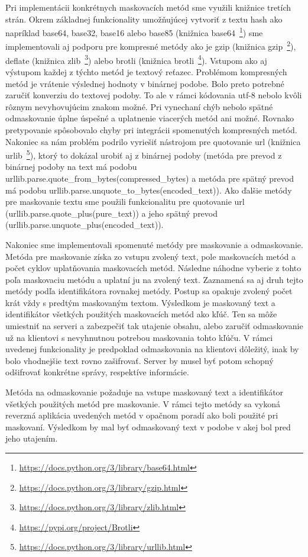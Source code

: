 \documentclass[conference, 11pt,slovak,a4paper,twoside]{IEEEtran}
\begin{document}
Pri implementácii konkrétnych maskovacích metód sme využili knižnice tretích strán. Okrem základnej funkcionality umožňujúcej vytvoriť z textu hash ako napríklad base64, base32, base16 alebo base85 (knižnica base64~\footnote{\url{https://docs.python.org/3/library/base64.html}}) sme implementovali aj podporu pre kompresné metódy ako je gzip (knižnica gzip~\footnote{\url{https://docs.python.org/3/library/gzip.html}}), deflate (knižnica zlib~\footnote{\url{https://docs.python.org/3/library/zlib.html}}) alebo brotli (knižnica brotli~\footnote{\url{https://pypi.org/project/Brotli}}). Vstupom ako aj výstupom každej z týchto metód je textový reťazec. Problémom kompresných metód je vrátenie výslednej hodnoty v binárnej podobe. Bolo preto potrebné zaručiť konverziu do textovej podoby. To ale v rámci kódovania utf-8 nebolo kvôli rôznym nevyhovujúcim znakom možné. Pri vynechaní chýb nebolo spätné odmaskovanie úplne úspešné a uplatnenie viacerých metód ani možné. Rovnako pretypovanie spôsobovalo chyby pri integrácii spomenutých kompresných metód. Nakoniec sa nám problém podrilo vyriešiť nástrojom pre quotovanie url (knižnica urlib~\footnote{\url{https://docs.python.org/3/library/urllib.html}}), ktorý to dokázal urobiť aj z binárnej podoby (metóda pre prevod z binárnej podoby na text má podobu urllib.parse.quote\_from\_bytes(compressed\_bytes) a metóda pre spätný prevod má podobu urllib.parse.unquote\_to\_bytes(encoded\_text)). Ako ďalšie metódy pre maskovanie textu sme použili funkcionalitu pre quotovanie url (urllib.parse.quote\_plus(pure\_text)) a jeho spätný prevod (urllib.parse.unquote\_plus(encoded\_text)).

Nakoniec sme implementovali spomenuté metódy pre maskovanie a odmaskovanie. Metóda pre maskovanie získa zo vstupu zvolený text, pole maskovacích metód a počet cyklov uplatňovania maskovacích metód. Následne náhodne vyberie z tohto poľa maskovaciu metódu a uplatní ju na zvolený text. Zaznamená sa aj druh tejto metódy podľa identifikátora rovnakej metódy. Postup sa opakuje zvolený počet krát vždy s predtým maskovaným textom. Výsledkom je maskovaný text a identifikátor všetkých použitých maskovacích metód ako kľúč. Ten sa môže umiestniť na serveri a zabezpečiť tak utajenie obsahu, alebo zaručiť odmaskovanie už na klientovi s nevyhnutnou potrebou maskovania tohto kľúču. V rámci uvedenej funkcionality je predpoklad odmaskovania na klientovi dôležitý, inak by bolo vhodnejšie text rovno zašifrovať. Server by musel byť potom schopný odšifrovať konkrétne správy, respektíve informácie.

Metóda na odmaskovanie požaduje na vstupe maskovaný text a identifikátor všetkých použitých metód pre maskovanie. V rámci tejto metódy sa vykoná reverzná aplikácia uvedených metód v opačnom poradí ako boli použité pri maskovaní. Výsledkom by mal byť odmaskovaný text v podobe v akej bol pred jeho utajením.
\end{document}
